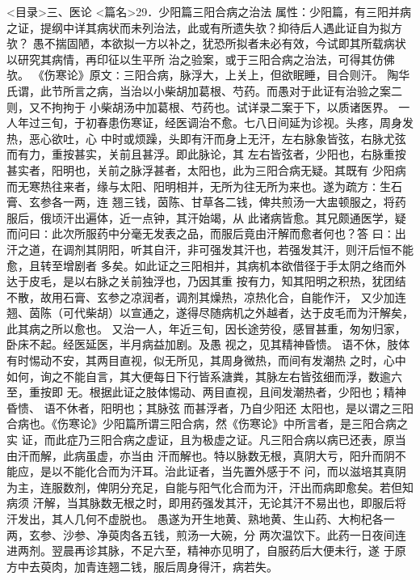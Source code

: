 \documentclass[a4paper,12pt,UTF8,twoside]{ctexbook}
\begin{document}
<目录>三、医论
<篇名>29．少阳篇三阳合病之治法
属性：少阳篇，有三阳并病之证，提纲中详其病状而未列治法，此或有所遗失欤？抑待后人遇此证自为拟方欤？ 
愚不揣固陋，本欲拟一方以补之，犹恐所拟者未必有效，今试即其所载病状以研究其病情，再印征以生平所 
治之验案，或于三阳合病之治法，可得其仿佛欤。 
《伤寒论》原文∶三阳合病，脉浮大，上关上，但欲眠睡，目合则汗。 
陶华氏谓，此节所言之病，当治以小柴胡加葛根、芍药。而愚对于此证有治验之案二则，又不拘拘于 
小柴胡汤中加葛根、芍药也。试详录二案于下，以质诸医界。 
一人年过三旬，于初春患伤寒证，经医调治不愈。七八日间延为诊视。头疼，周身发热，恶心欲吐，心 
中时或烦躁，头即有汗而身上无汗，左右脉象皆弦，右脉尤弦而有力，重按甚实，关前且甚浮。即此脉论，其 
左右皆弦者，少阳也，右脉重按甚实者，阳明也，关前之脉浮甚者，太阳也，此为三阳合病无疑。其既有 
少阳病而无寒热往来者，缘与太阳、阳明相并，无所为往无所为来也。遂为疏方∶生石膏、玄参各一两，连 
翘三钱，茵陈、甘草各二钱，俾共煎汤一大盅顿服之，将药服后，俄顷汗出遍体，近一点钟，其汗始竭，从 
此诸病皆愈。其兄颇通医学，疑而问曰∶此次所服药中分毫无发表之品，而服后竟由汗解而愈者何也？答 
曰∶出汗之道，在调剂其阴阳，听其自汗，非可强发其汗也，若强发其汗，则汗后恒不能愈，且转至增剧者 
多矣。如此证之三阳相并，其病机本欲借径于手太阴之络而外达于皮毛，是以右脉之关前独浮也，乃因其重 
按有力，知其阳明之积热，犹团结不散，故用石膏、玄参之凉润者，调剂其燥热，凉热化合，自能作汗， 
又少加连翘、茵陈（可代柴胡）以宣通之，遂得尽随病机之外越者，达于皮毛而为汗解矣，此其病之所以愈也。 
又治一人，年近三旬，因长途劳役，感冒甚重，匆匆归家，卧床不起。经医延医，半月病益加剧。及愚 
视之，见其精神昏愦。 语不休，肢体有时惕动不安，其两目直视，似无所见，其周身微热，而间有发潮热 
之时，心中如何，询之不能自言，其大便每日下行皆系溏粪，其脉左右皆弦细而浮，数逾六至，重按即 
无。根据此证之肢体惕动、两目直视，且间发潮热者，少阳也；精神昏愦、 语不休者，阳明也；其脉弦 
而甚浮者，乃自少阳还 
太阳也，是以谓之三阳合病也。《伤寒论》少阳篇所谓三阳合病，然《伤寒论》中所言者，是三阳合病之实 
证，而此症乃三阳合病之虚证，且为极虚之证。凡三阳合病以病已还表，原当由汗而解，此病虽虚，亦当由 
汗而解也。特以脉数无根，真阴大亏，阳升而阴不能应，是以不能化合而为汗耳。治此证者，当先置外感于不 
问，而以滋培其真阴为主，连服数剂，俾阴分充足，自能与阳气化合而为汗，汗出而病即愈矣。若但知病须 
汗解，当其脉数无根之时，即用药强发其汗，无论其汗不易出也，即服后将汗发出，其人几何不虚脱也。 
愚遂为开生地黄、熟地黄、生山药、大枸杞各一两，玄参、沙参、净萸肉各五钱，煎汤一大碗，分 
两次温饮下。此药一日夜间连进两剂。翌晨再诊其脉，不足六至，精神亦见明了，自服药后大便未行，遂 
于原方中去萸肉，加青连翘二钱，服后周身得汗，病若失。 
\end{document}
